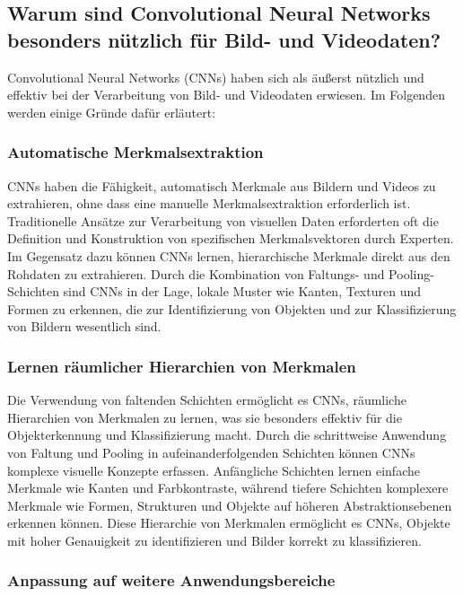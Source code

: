 \subsection{Warum sind Convolutional Neural Networks besonders nützlich für Bild- und Videodaten?}

    Convolutional Neural Networks (CNNs) haben sich als äußerst nützlich und effektiv bei der Verarbeitung von Bild- und Videodaten erwiesen. Im Folgenden werden einige Gründe dafür erläutert:

\subsubsection{Automatische Merkmalsextraktion}

    CNNs haben die Fähigkeit, automatisch Merkmale aus Bildern und Videos zu extrahieren, ohne dass eine manuelle Merkmalsextraktion erforderlich ist. 
    Traditionelle Ansätze zur Verarbeitung von visuellen Daten erforderten oft die Definition und Konstruktion von spezifischen Merkmalsvektoren durch Experten. 
    Im Gegensatz dazu können CNNs lernen, hierarchische Merkmale direkt aus den Rohdaten zu extrahieren. 
    Durch die Kombination von Faltungs- und Pooling-Schichten sind CNNs in der Lage, lokale Muster wie Kanten, Texturen und Formen zu erkennen, die zur Identifizierung von Objekten und zur Klassifizierung von Bildern wesentlich sind.

\subsubsection{Lernen räumlicher Hierarchien von Merkmalen}

    Die Verwendung von faltenden Schichten ermöglicht es CNNs, räumliche Hierarchien von Merkmalen zu lernen, was sie besonders effektiv für die Objekterkennung und Klassifizierung macht. 
    Durch die schrittweise Anwendung von Faltung und Pooling in aufeinanderfolgenden Schichten können CNNs komplexe visuelle Konzepte erfassen. 
    Anfängliche Schichten lernen einfache Merkmale wie Kanten und Farbkontraste, während tiefere Schichten komplexere Merkmale wie Formen, Strukturen und Objekte auf höheren Abstraktionsebenen erkennen können. 
    Diese Hierarchie von Merkmalen ermöglicht es CNNs, Objekte mit hoher Genauigkeit zu identifizieren und Bilder korrekt zu klassifizieren.

\subsubsection{Anpassung auf weitere Anwendungsbereiche}

